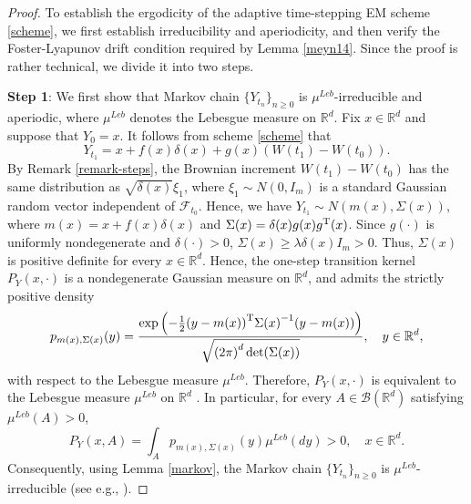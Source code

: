 \documentclass[preprint,12pt,compress]{elsarticle}
\begin{document}
\begin{proof}
To establish the ergodicity of the adaptive time-stepping EM scheme \eqref{scheme}, we first establish irreducibility and aperiodicity, and then verify the Foster-Lyapunov drift condition required by Lemma \ref{meyn14}. Since the proof is rather technical, we divide it into two steps.

\textbf{Step 1}: 
We first show that Markov chain ${\{ {Y_{{t_n}}}\} _{n \ge 0}}$ is ${\mu ^{Leb}}$-irreducible and aperiodic, where ${\mu ^{Leb}}$ denotes the Lebesgue measure on $\mathbb{R}^d$. Fix $x \in \mathbb{R}^d$ and suppose that $Y_0 = x$. It follows from scheme \eqref{scheme} that
\begin{equation*}
	{Y_{{t_{ 1}}}} = x + f(x)\delta (x) + g(x)\left( {W({t_{ 1}}) - W({t_0})} \right).
\end{equation*}
By Remark \ref{remark-steps}, the Brownian increment $W(t_{1}) - W(t_0)$ has the same distribution as $\sqrt {\delta (x)} {\xi _{ 1}}$, where ${\xi _1} \sim N(0,{I_{m}})$ is a standard Gaussian random vector independent of $\mathcal{F}_{t_0}$. 
Hence, we have ${Y_{{t_1}}} \sim N\left( {m(x),\Sigma (x)} \right)$,
where $ m(x) = x+f(x)\delta(x)$ and $\Sigma(x) = \delta(x)g(x)g^{\rm T}(x)$. 
Since $g(\cdot)$ is uniformly nondegenerate and $\delta(\cdot) > 0$, $\Sigma (x)  \ge \lambda \delta (x){I_m} > 0$. Thus, $\Sigma(x)$ is positive definite for every $x \in \mathbb{R}^d$. Hence,
the one-step transition kernel $P_Y(x, \cdot)$ is a nondegenerate Gaussian measure on $\mathbb{R}^d$, and admits the strictly positive density 
\begin{equation*}
	{p_{m(x),\Sigma (x)}}(y) = \frac{{\exp \left( { - \frac{1}{2}{{(y - m(x))}^{\rm{T}}}\Sigma {{(x)}^{ - 1}}(y - m(x))} \right)}}{{\sqrt {{{(2\pi )}^d}\det (\Sigma (x))} }}, \quad y \in \mathbb{R}^d,
\end{equation*}
with respect to the Lebesgue measure $\mu^{Leb}$. Therefore, $P_Y(x,\cdot)$ is equivalent to the Lebesgue measure $\mu^{Leb}$ on $\mathbb{R}^d$ \cite[p. 87]{liu2025numerical}. In particular, for every $A \in \mathcal{B}(\mathbb{R}^d)$ satisfying $\mu^{Leb}(A) > 0$,
\begin{equation*}
	{P_Y}(x,A) = \int_A {{p_{m(x),\Sigma (x)}}(y){\mu ^{Leb}}(dy) > 0} , \quad x\in \mathbb{R}^d.
\end{equation*}
Consequently, using Lemma \ref{markov}, the Markov chain ${\{ {Y_{{t_n}}}\} _{n \ge 0}}$ is ${\mu ^{Leb}}$-irreducible (see e.g., \cite[Section 4.2.1, p. 82]{meyn2009markov}).


\end{proof}
\end{document}
